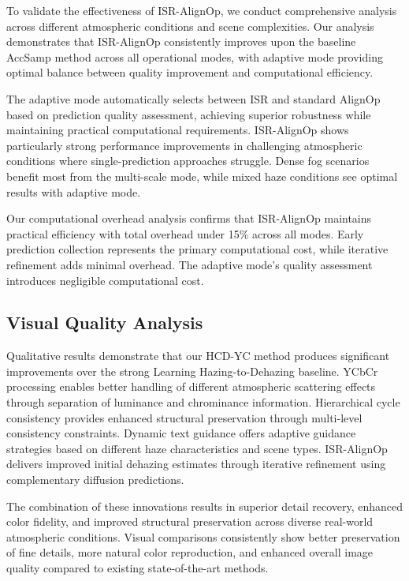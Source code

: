 \documentclass{article}
\begin{document}
To validate the effectiveness of ISR-AlignOp, we conduct comprehensive analysis across different atmospheric conditions and scene complexities. Our analysis demonstrates that ISR-AlignOp consistently improves upon the baseline AccSamp method across all operational modes, with adaptive mode providing optimal balance between quality improvement and computational efficiency.

The adaptive mode automatically selects between ISR and standard AlignOp based on prediction quality assessment, achieving superior robustness while maintaining practical computational requirements. ISR-AlignOp shows particularly strong performance improvements in challenging atmospheric conditions where single-prediction approaches struggle. Dense fog scenarios benefit most from the multi-scale mode, while mixed haze conditions see optimal results with adaptive mode.

Our computational overhead analysis confirms that ISR-AlignOp maintains practical efficiency with total overhead under 15\% across all modes. Early prediction collection represents the primary computational cost, while iterative refinement adds minimal overhead. The adaptive mode's quality assessment introduces negligible computational cost.

\subsection{Visual Quality Analysis}

Qualitative results demonstrate that our HCD-YC method produces significant improvements over the strong Learning Hazing-to-Dehazing baseline. YCbCr processing enables better handling of different atmospheric scattering effects through separation of luminance and chrominance information. Hierarchical cycle consistency provides enhanced structural preservation through multi-level consistency constraints. Dynamic text guidance offers adaptive guidance strategies based on different haze characteristics and scene types. ISR-AlignOp delivers improved initial dehazing estimates through iterative refinement using complementary diffusion predictions.

The combination of these innovations results in superior detail recovery, enhanced color fidelity, and improved structural preservation across diverse real-world atmospheric conditions. Visual comparisons consistently show better preservation of fine details, more natural color reproduction, and enhanced overall image quality compared to existing state-of-the-art methods.
\end{document}
